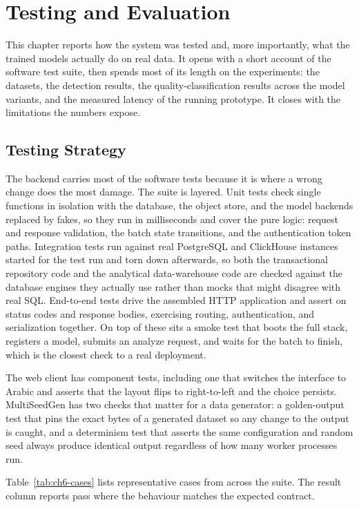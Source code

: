 \chapter{Testing and Evaluation}
\label{ch:testing}

This chapter reports how the system was tested and, more importantly, what the
trained models actually do on real data. It opens with a short account of the
software test suite, then spends most of its length on the experiments: the
datasets, the detection results, the quality-classification results across the
model variants, and the measured latency of the running prototype. It closes with
the limitations the numbers expose.

\section{Testing Strategy}

The backend carries most of the software tests because it is where a wrong change
does the most damage. The suite is layered. Unit tests check single functions in
isolation with the database, the object store, and the model backends replaced by
fakes, so they run in milliseconds and cover the pure logic: request and response
validation, the batch state transitions, and the authentication token paths.
Integration tests run against real PostgreSQL and ClickHouse instances started for the test run and torn down afterwards, so both the transactional repository code and the analytical data-warehouse code are checked against the database engines they actually use rather than mocks that might disagree with real SQL.
End-to-end tests drive the assembled HTTP application and assert on status codes
and response bodies, exercising routing, authentication, and serialization
together. On top of these sits a smoke test that boots the full stack, registers
a model, submits an analyze request, and waits for the batch to finish, which is
the closest check to a real deployment.

The web client has component tests, including one that switches the interface to
Arabic and asserts that the layout flips to right-to-left and the choice
persists. MultiSeedGen has two checks that matter for a data generator: a
golden-output test that pins the exact bytes of a generated dataset so any change
to the output is caught, and a determinism test that asserts the same
configuration and random seed always produce identical output regardless of how
many worker processes run.

Table~\ref{tab:ch6-cases} lists representative cases from across the suite. The
result column reports pass where the behaviour matches the expected contract.

